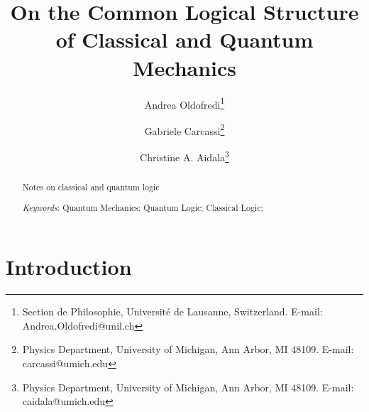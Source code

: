\documentclass[11pt, executivepaper]{article}
\begin{document}
\title{\textbf{On the Common Logical Structure of Classical and Quantum Mechanics}}

\author{Andrea Oldofredi\thanks{Section de Philosophie, Universit\'e de Lausanne, Switzerland. E-mail: Andrea.Oldofredi@unil.ch} \and Gabriele Carcassi\thanks{Physics Department, University of Michigan, Ann Arbor, MI 48109. E-mail: carcassi@umich.edu} \and Christine A. Aidala\thanks{Physics Department, University of Michigan, Ann Arbor, MI 48109. E-mail: caidala@umich.edu}}


\maketitle

\begin{abstract}
\center Notes on classical and quantum logic
\vspace{4mm}

\noindent \emph{Keywords}: Quantum Mechanics; Quantum Logic; Classical Logic; 
\end{abstract}
\vspace{5mm}
\clearpage

\tableofcontents
\vspace{5mm}

\section{Introduction}
\end{document}
